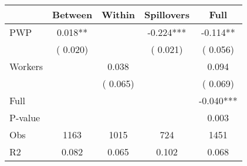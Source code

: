 
\begin{tabular}{l*{4}{c}}\hline&\multicolumn{1}{c}{Between}&\multicolumn{1}{c}{Within}&\multicolumn{1}{c}{Spillovers}&\multicolumn{1}{c}{Full}\\ \hline
 PWP           &              0.018**      &                                               &       -0.224*** &        -0.114**                            \\ 
                               &        (       0.020)           &                                       &       (       0.021)     &      (       0.056)                                           \\ 
 Workers       &                                               &        0.038    &                                &             0.094                            \\ 
                               &                                               & (       0.065)                  &                                        &      (       0.069)                                           \\ 
\hline                                                                                                                                                                                                                                            
 Full                  &                                               &                                               &                                        &            -0.040***                                     \\ 
 P-value               &                                               &                                               &                                        &             0.003                                           \\ 
 Obs                   &               1163               &       1015                       &       724                &              1451                                               \\ 
 R2                    &                      0.082              &              0.065                      &              0.102               &                     0.068                                              \\ 
\hline \end{tabular}                                                                                                                                                                                                              